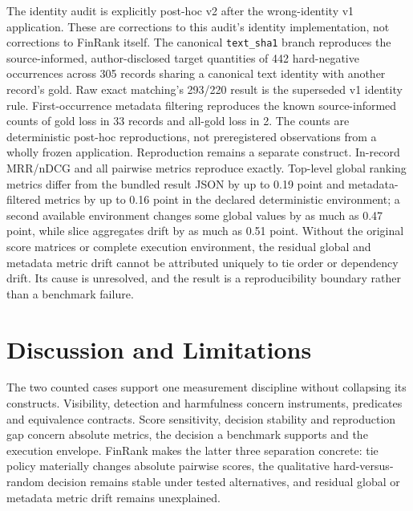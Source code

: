 \documentclass[10pt,conference]{IEEEtran}
\begin{document}
The identity audit is explicitly post-hoc v2 after the wrong-identity v1 application. These are corrections to this audit's identity implementation, not corrections to FinRank itself. The canonical \texttt{text\_sha1} branch reproduces the source-informed, author-disclosed target quantities of 442 hard-negative occurrences across 305 records sharing a canonical text identity with another record's gold. Raw exact matching's 293/220 result is the superseded v1 identity rule. First-occurrence metadata filtering reproduces the known source-informed counts of gold loss in 33 records and all-gold loss in 2. The counts are deterministic post-hoc reproductions, not preregistered observations from a wholly frozen application.
Reproduction remains a separate construct. In-record MRR/nDCG and all pairwise metrics reproduce exactly. Top-level global ranking metrics differ from the bundled result JSON by up to 0.19 point and metadata-filtered metrics by up to 0.16 point in the declared deterministic environment; a second available environment changes some global values by as much as 0.47 point, while slice aggregates drift by as much as 0.51 point. Without the original score matrices or complete execution environment, the residual global and metadata metric drift cannot be attributed uniquely to tie order or dependency drift. Its cause is unresolved, and the result is a reproducibility boundary rather than a benchmark failure.
\section{Discussion and Limitations}
The two counted cases support one measurement discipline without collapsing its constructs. Visibility, detection and harmfulness concern instruments, predicates and equivalence contracts. Score sensitivity, decision stability and reproduction gap concern absolute metrics, the decision a benchmark supports and the execution envelope. FinRank makes the latter three separation concrete: tie policy materially changes absolute pairwise scores, the qualitative hard-versus-random decision remains stable under tested alternatives, and residual global or metadata metric drift remains unexplained.
\end{document}
